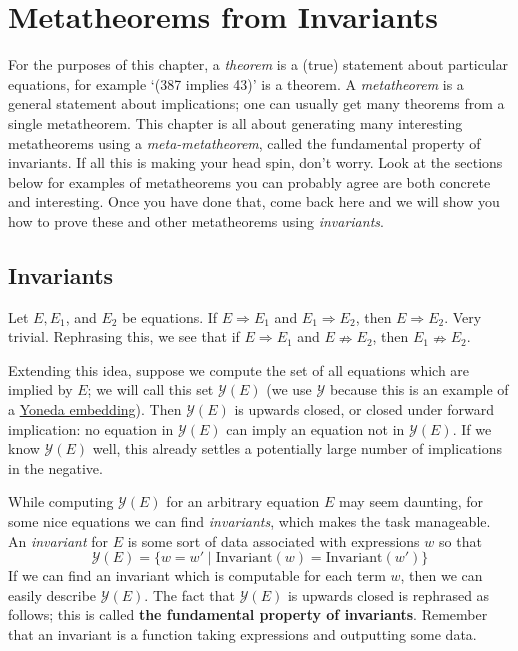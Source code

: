 \chapter{Metatheorems from Invariants}\label{metatheory-chapter}

For the purposes of this chapter, a \emph{theorem} is a (true) statement about particular equations, for example `(387 implies 43)' is a theorem. A \emph{metatheorem} is a general statement about implications; one can usually get many theorems from a single metatheorem. This chapter is all about generating many interesting metatheorems using a \emph{meta-metatheorem}, called the fundamental property of invariants. If all this is making your head spin, don't worry. Look at the sections below for examples of metatheorems you can probably agree are both concrete and interesting. Once you have done that, come back here and we will show you how to prove these and other metatheorems using \emph{invariants}.

\section{Invariants}
Let $E, E_1$, and $E_2$ be equations. If $E \Rightarrow E_1$ and $E_1 \Rightarrow E_2$, then $E \Rightarrow E_2$. Very trivial. Rephrasing this, we see that if $E \Rightarrow E_1$ and $E \nRightarrow E_2$, then $E_1\nRightarrow E_2$.

Extending this idea, suppose we compute the set of all equations which are implied by $E$; we will call this set $\mathcal{Y}(E)$ (we use $\mathcal{Y}$ because this is an example of a \href{https://en.wikipedia.org/wiki/Yoneda_lemma#The_Yoneda_embedding}{Yoneda embedding}). Then $\mathcal{Y}(E)$ is upwards closed, or closed under forward implication: no equation in $\mathcal{Y}(E)$ can imply an equation not in $\mathcal{Y}(E)$. If we know $\mathcal{Y}(E)$ well, this already settles a potentially large number of implications in the negative.

While computing $\mathcal{Y}(E)$ for an arbitrary equation $E$ may seem daunting, for some nice equations we can find \emph{invariants}, which makes the task manageable. An \emph{invariant} for $E$ is some sort of data associated with expressions $w$ so that
\[
\mathcal{Y}(E) = \{w = w' \mid \text{Invariant}(w) = \text{Invariant}(w')\}
\]
If we can find an invariant which is computable for each term $w$, then we can easily describe $\mathcal{Y}(E)$. The fact that $\mathcal{Y}(E)$ is upwards closed is rephrased as follows; this is called \textbf{the fundamental property of invariants}. Remember that an invariant is a function taking expressions and outputting some data.


